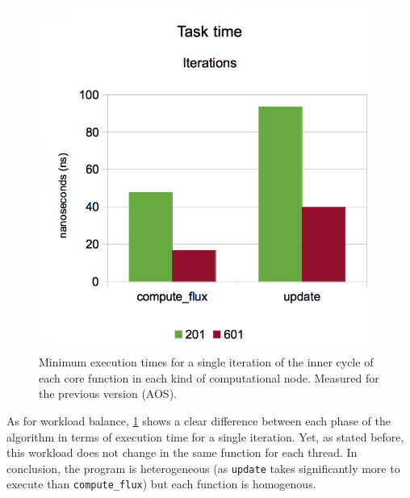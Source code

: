 \documentclass[abstract=on,9pt,twocolumn]{scrartcl}
\begin{document}
\begin{figure}[!p]
	\begin{center}
		\includegraphics[width=\columnwidth]{images/report.april/tasktimeAOS.png}
	\end{center}
	\caption{Minimum execution times for a single iteration of the inner cycle of each core function in each kind of computational node. Measured for the previous version (AOS).}
	\label{fig:tasktimeAOS}
\end{figure}

As for workload balance, \cref{fig:tasktimeAOS} shows a clear difference between each phase of the algorithm in terms of execution time for a single iteration. Yet, as stated before, this workload does not change in the same function for each thread. In conclusion, the program is heterogeneous (as \texttt{update} takes significantly more to execute than \texttt{compute\_flux}) but each function is homogenous.
\end{document}
